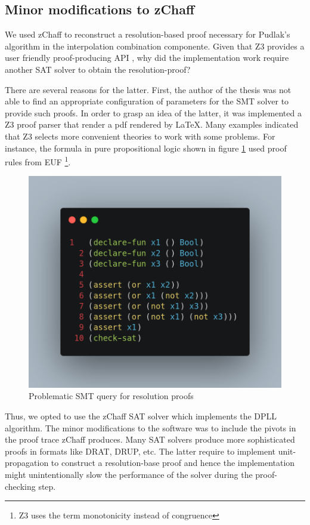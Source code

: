 \subsection{Minor modifications to zChaff}

We used zChaff to reconstruct a resolution-based proof necessary 
for Pudlak's algorithm in the interpolation combination componente. 
Given that Z3 provides a user friendly proof-producing API
\cite{inproceedingsproofsrefutationsz3}, why did the implementation
work require another SAT solver to obtain the resolution-proof?

There are several reasons for the latter. First, the author of the
thesis was not able to find an appropriate configuration of parameters
for the SMT solver to provide such proofs. In order to grasp an idea
of the latter, it was implemented a Z3 proof parser that render
a pdf rendered by \LaTeX. Many examples indicated that
Z3 selects more convenient theories to work with some problems. For
instance, the formula in pure propositional logic shown in figure 
\ref{query_proof_problem} used proof rules from EUF \footnote{Z3 uses
the term monotonicity instead of congruence}.

%


\begin{figure}
\centering
\includegraphics[scale=0.2]{query_screenshot}
\caption{Problematic SMT query for resolution proofs} \label{query_proof_problem}
\end{figure}

Thus, we opted to use the zChaff SAT solver which implements the DPLL algorithm. 
The minor modifications to the software was to include the pivots 
in the proof trace zChaff produces. Many SAT solvers produce more sophisticated 
proofs in formats like DRAT, DRUP, etc. The latter require to implement unit-propagation
to construct a resolution-base proof and hence the implementation might unintentionally
slow the performance of the solver during the proof-checking step.

